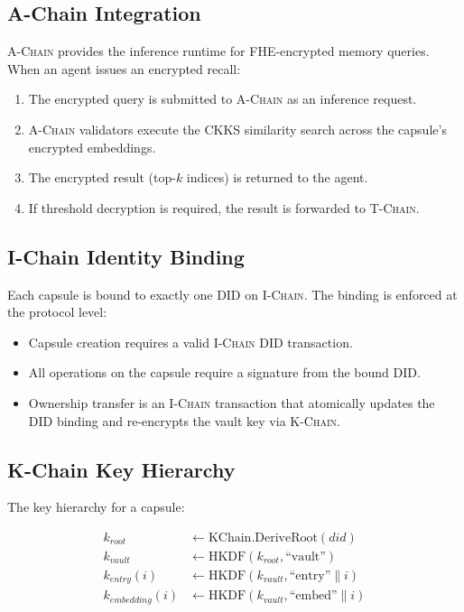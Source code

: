 \documentclass[11pt,letterpaper]{article}
\theoremstyle{definition}
\theoremstyle{remark}
\newcommand{\AChain}{\textsc{A-Chain}}
\newcommand{\IChain}{\textsc{I-Chain}}
\newcommand{\KChain}{\textsc{K-Chain}}
\newcommand{\TChain}{\textsc{T-Chain}}
\newcommand{\CKKS}{\textsc{CKKS}}
\newcommand{\DID}{\textsc{DID}}
\newcommand{\FHE}{\textsc{FHE}}
\begin{document}
\subsection{A-Chain Integration}

\AChain{} provides the inference runtime for \FHE{}-encrypted memory queries. When an agent issues an encrypted recall:

\begin{enumerate}
    \item The encrypted query is submitted to \AChain{} as an inference request.
    \item \AChain{} validators execute the \CKKS{} similarity search across the capsule's encrypted embeddings.
    \item The encrypted result (top-$k$ indices) is returned to the agent.
    \item If threshold decryption is required, the result is forwarded to \TChain{}.
\end{enumerate}

\subsection{I-Chain Identity Binding}

Each capsule is bound to exactly one \DID{} on \IChain{}. The binding is enforced at the protocol level:

\begin{itemize}
    \item Capsule creation requires a valid \IChain{} \DID{} transaction.
    \item All operations on the capsule require a signature from the bound \DID{}.
    \item Ownership transfer is an \IChain{} transaction that atomically updates the \DID{} binding and re-encrypts the vault key via \KChain{}.
\end{itemize}

\subsection{K-Chain Key Hierarchy}

The key hierarchy for a capsule:

\begin{align}
k_{\textit{root}} &\leftarrow \text{KChain.DeriveRoot}(\textit{did}) \\
k_{\textit{vault}} &\leftarrow \text{HKDF}(k_{\textit{root}}, \text{``vault''}) \\
k_{\textit{entry}}(i) &\leftarrow \text{HKDF}(k_{\textit{vault}}, \text{``entry''} \| i) \\
k_{\textit{embedding}}(i) &\leftarrow \text{HKDF}(k_{\textit{vault}}, \text{``embed''} \| i)
\end{align}
\end{document}
